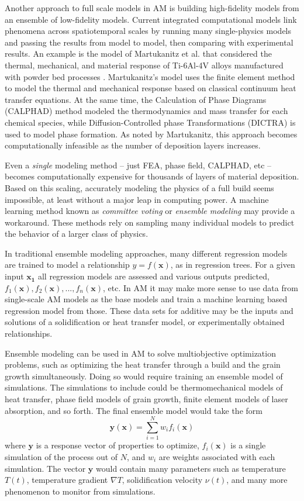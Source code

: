 Another approach to full scale models in AM is building high-fidelity models from an ensemble of low-fidelity models. Current integrated computational models link phenomena across spatiotemporal scales by running many single-physics models and passing the results from model to model, then comparing with experimental results. An example is the model of Martukanitz et al. that considered the thermal, mechanical, and material response of Ti-6Al-4V alloys manufactured with powder bed processes \cite{Martukanitz2014}. Martukanitz's model uses the finite element method to model the thermal and mechanical response based on classical continuum heat transfer equations. At the same time, the Calculation of Phase Diagrams (CALPHAD) method modeled the thermodynamics and mass transfer for each chemical species, while Diffusion-Controlled phase Transformations (DICTRA) is used to model phase formation. As noted by Martukanitz, this approach becomes computationally infeasible as the number of deposition layers increases.

Even a \textit{single} modeling method -- just FEA, phase field, CALPHAD, etc -- becomes computationally expensive for thousands of layers of material deposition. Based on this scaling, accurately modeling the physics of a full build seems impossible, at least without a major leap in computing power. A machine learning method known as \textit{committee voting} or \textit{ensemble modeling} may provide a workaround. These methods rely on sampling many individual models to predict the behavior of a larger class of physics.

In traditional ensemble modeling approaches, many different regression models are trained to model a relationship $y = f(\mathbf{x})$, as in regression trees. For a given input $\mathbf{x_1}$ all regression models are assessed and various outputs predicted, $f_1(\mathbf{x}), f_2(\mathbf{x}), ..., f_n(\mathbf{x})$, etc. In AM it may make more sense to use data from single-scale AM models as the base models and train a machine learning based regression model from those. These data sets for additive may be the inputs and solutions of a solidification or heat transfer model, or experimentally obtained relationships.

Ensemble modeling can be used in AM to solve multiobjective optimization problems, such as optimizing the heat transfer through a build and the grain growth simultaneously. Doing so would require training an ensemble model of simulations. The simulations to include could be thermomechanical models of heat transfer, phase field models of grain growth, finite element models of laser absorption, and so forth. The final ensemble model would take the form
\begin{equation}
	\mathbf{y}(\mathbf{x}) = \sum_{i=1}^N w_i f_i(\mathbf{x})
	\label{ensemble}
\end{equation}
where $\mathbf{y}$ is a response vector of properties to optimize, $f_i(\mathbf{x})$ is a single simulation of the process out of $N$, and $w_i$ are weights associated with each simulation. The vector $\mathbf{y}$ would contain many parameters such as temperature $T(t)$, temperature gradient $\nabla T$, solidification velocity $\nu(t)$, and many more phenomenon to monitor from simulations. 

